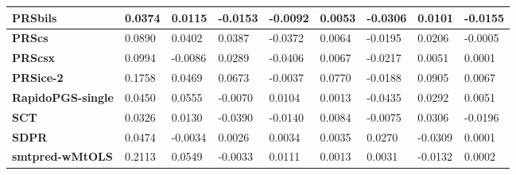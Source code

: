 \documentclass[pdflatex,sn-basic]{sn-jnl}
\begin{document}
\begin{table}[!ht]
{\begin{tabular}{|l|l|l|l|l|l|l|l|l|}
\hline
\textbf{PRSbils} & \cellcolor[HTML]{FEDB80}0.0374 & \cellcolor[HTML]{FCBF7B}0.0115 & \cellcolor[HTML]{FA9673}-0.0153 & \cellcolor[HTML]{FEDD81}-0.0092 & \cellcolor[HTML]{FEEA83}0.0053 & \cellcolor[HTML]{FEDD81}-0.0306 & \cellcolor[HTML]{FCEA84}0.0101 & \cellcolor[HTML]{F98370}-0.0155 \\
\hline
\textbf{PRScs} & \cellcolor[HTML]{F7E984}0.0890 & \cellcolor[HTML]{CEDD82}0.0402 & \cellcolor[HTML]{EDE683}0.0387 & \cellcolor[HTML]{F8756D}-0.0372 & \cellcolor[HTML]{FFEB84}0.0064 & \cellcolor[HTML]{F3E884}-0.0195 & \cellcolor[HTML]{E8E583}0.0206 & \cellcolor[HTML]{FEE683}-0.0005 \\
\hline
\textbf{PRScsx} & \cellcolor[HTML]{EFE784}0.0994 & \cellcolor[HTML]{FA9272}-0.0086 & \cellcolor[HTML]{FFEB84}0.0289 & \cellcolor[HTML]{F8696B}-0.0406 & \cellcolor[HTML]{FEEB84}0.0067 & \cellcolor[HTML]{F8E984}-0.0217 & \cellcolor[HTML]{FEE482}0.0051 & \cellcolor[HTML]{FEEA83}0.0001 \\
\hline
\textbf{PRSice-2} & \cellcolor[HTML]{B2D580}0.1758 & \cellcolor[HTML]{ABD380}0.0469 & \cellcolor[HTML]{B7D780}0.0673 & \cellcolor[HTML]{F9EA84}-0.0037 & \cellcolor[HTML]{63BE7B}0.0770 & \cellcolor[HTML]{F1E784}-0.0188 & \cellcolor[HTML]{63BE7B}0.0905 & \cellcolor[HTML]{EFE784}0.0067 \\
\hline
\textbf{RapidoPGS-single} & \cellcolor[HTML]{FEDE81}0.0450 & \cellcolor[HTML]{7EC67D}0.0555 & \cellcolor[HTML]{FBA676}-0.0070 & \cellcolor[HTML]{C7DB81}0.0104 & \cellcolor[HTML]{FEE883}0.0013 & \cellcolor[HTML]{FCC17B}-0.0435 & \cellcolor[HTML]{D7E082}0.0292 & \cellcolor[HTML]{F3E884}0.0051 \\
\hline
\textbf{SCT} & \cellcolor[HTML]{FED980}0.0326 & \cellcolor[HTML]{FCC37C}0.0130 & \cellcolor[HTML]{F8696B}-0.0390 & \cellcolor[HTML]{FDCB7E}-0.0140 & \cellcolor[HTML]{FAEA84}0.0084 & \cellcolor[HTML]{D5DF82}-0.0075 & \cellcolor[HTML]{D5DF82}0.0306 & \cellcolor[HTML]{F8696B}-0.0196 \\
\hline
\textbf{SDPR} & \cellcolor[HTML]{FEDF81}0.0474 & \cellcolor[HTML]{FA9D75}-0.0034 & \cellcolor[HTML]{FCB87A}0.0026 & \cellcolor[HTML]{E0E283}0.0034 & \cellcolor[HTML]{FEE983}0.0035 & \cellcolor[HTML]{7EC67D}0.0270 & \cellcolor[HTML]{FA9974}-0.0309 & \cellcolor[HTML]{FEEA83}0.0001 \\
\hline
\textbf{smtpred-wMtOLS} & \cellcolor[HTML]{95CD7E}0.2113 & \cellcolor[HTML]{82C77D}0.0549 & \cellcolor[HTML]{FBAD78}-0.0033 & \cellcolor[HTML]{C4DA81}0.0111 & \cellcolor[HTML]{FEE883}0.0013 & \cellcolor[HTML]{BAD780}0.0031 & \cellcolor[HTML]{FCBE7B}-0.0132 & \cellcolor[HTML]{FFEB84}0.0002 \\

\end{tabular}}
\end{table}
\end{document}
